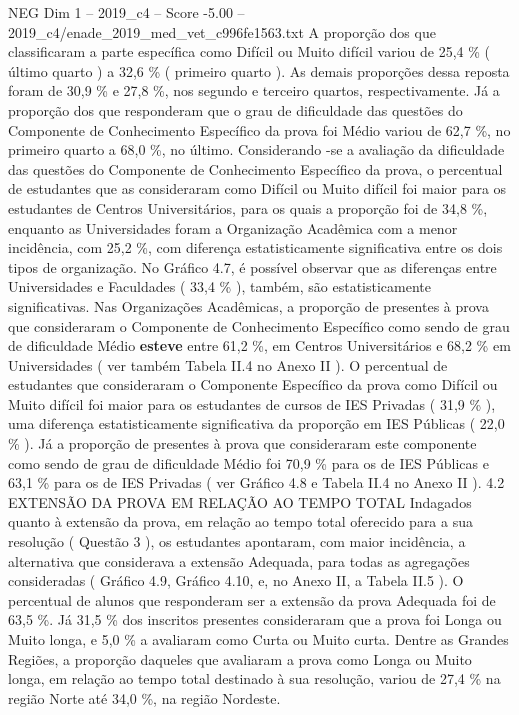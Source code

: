 \begin{textsample}{NEG Dim 1 – 2019\_c4 – Score -5.00 – 2019\_c4/enade\_2019\_med\_vet\_c996fe1563.txt}
A proporção dos que classificaram a parte específica como Difícil ou Muito difícil variou de 25,4 \% ( último quarto ) a 32,6 \% ( primeiro quarto ).
As demais proporções dessa reposta foram de 30,9 \% e 27,8 \%, nos segundo e terceiro quartos, respectivamente.
Já a proporção dos que responderam que o grau de dificuldade das questões do Componente de Conhecimento Específico da prova foi Médio variou de 62,7 \%, no primeiro quarto a 68,0 \%, no último.
Considerando -se a avaliação da dificuldade das questões do Componente de Conhecimento Específico da prova, o percentual de estudantes que as consideraram como Difícil ou Muito difícil foi maior para os estudantes de Centros Universitários, para os quais a proporção foi de 34,8 \%, enquanto as Universidades foram a Organização Acadêmica com a menor incidência, com 25,2 \%, com diferença estatisticamente significativa entre os dois tipos de organização.
No Gráfico 4.7, é possível observar que as diferenças entre Universidades e Faculdades ( 33,4 \% ), também, são estatisticamente significativas.
Nas Organizações Acadêmicas, a proporção de presentes à prova que consideraram o Componente de Conhecimento Específico como sendo de grau de dificuldade Médio \textbf{esteve} entre 61,2 \%, em Centros Universitários e 68,2 \% em Universidades ( ver também Tabela II.4 no Anexo II ).
O percentual de estudantes que consideraram o Componente Específico da prova como Difícil ou Muito difícil foi maior para os estudantes de cursos de IES Privadas ( 31,9 \% ), uma diferença estatisticamente significativa da proporção em IES Públicas ( 22,0 \% ).
Já a proporção de presentes à prova que consideraram este componente como sendo de grau de dificuldade Médio foi 70,9 \% para os de IES Públicas e 63,1 \% para os de IES Privadas ( ver Gráfico 4.8 e Tabela II.4 no Anexo II ). 4.2 EXTENSÃO DA PROVA EM RELAÇÃO AO TEMPO TOTAL Indagados quanto à extensão da prova, em relação ao tempo total oferecido para a sua resolução ( Questão 3 ), os estudantes apontaram, com maior incidência, a alternativa que considerava a extensão Adequada, para todas as agregações consideradas ( Gráfico 4.9, Gráfico 4.10, e, no Anexo II, a Tabela II.5 ).
O percentual de alunos que responderam ser a extensão da prova Adequada foi de 63,5 \%.
Já 31,5 \% dos inscritos presentes consideraram que a prova foi Longa ou Muito longa, e 5,0 \% a avaliaram como Curta ou Muito curta.
Dentre as Grandes Regiões, a proporção daqueles que avaliaram a prova como Longa ou Muito longa, em relação ao tempo total destinado à sua resolução, variou de 27,4 \% na região Norte até 34,0 \%, na região Nordeste.

\end{textsample}
